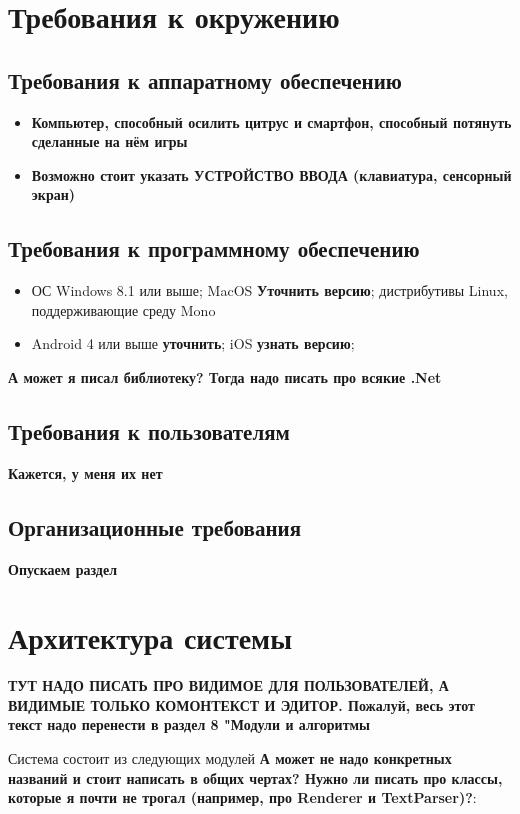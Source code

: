 \documentclass{fefu}
\begin{document}
	\section{Требования к окружению}
		\subsection{Требования к аппаратному обеспечению}
			\begin{itemize}
				\item \textbf{Компьютер, способный осилить цитрус и смартфон, способный 
				потянуть сделанные на нём игры}
				\item \textbf{Возможно стоит указать УСТРОЙСТВО ВВОДА (клавиатура, сенсорный
				экран)}
			\end{itemize}
		\subsection{Требования к программному обеспечению}
			\begin{itemize}
				\item ОС Windows 8.1 или выше; MacOS \textbf{Уточнить версию}; дистрибутивы 
				Linux, поддерживающие среду Mono
				\item Android 4 или выше \textbf{уточнить}; iOS \textbf{узнать версию};
			\end{itemize}
			\textbf{А может я писал библиотеку? Тогда надо писать про всякие .Net}
		\subsection{Требования к пользователям}
			\textbf{Кажется, у меня их нет}
		\subsection{Организационные требования}
			\textbf{Опускаем раздел}
	\section{Архитектура системы}
		\par \textbf{ТУТ НАДО ПИСАТЬ ПРО ВИДИМОЕ ДЛЯ ПОЛЬЗОВАТЕЛЕЙ, А ВИДИМЫЕ ТОЛЬКО 
		КОМОНТЕКСТ И ЭДИТОР. Пожалуй, весь этот текст надо перенести в раздел 8 "Модули и
		алгоритмы}
		\par Система состоит из следующих модулей \textbf{А может не надо конкретных названий
		и стоит написать в общих чертах? Нужно ли писать про классы, которые я почти не 
		трогал (например, про Renderer и TextParser)?}:
		
\end{document}
